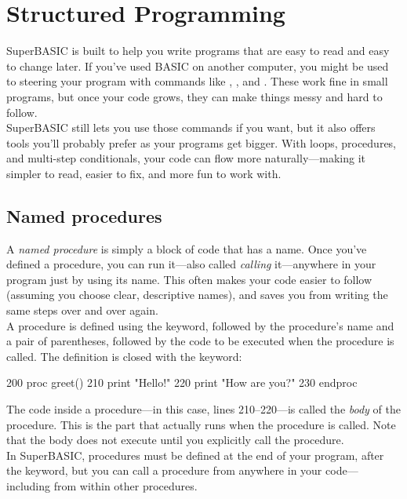\chapter{Structured Programming}
\label{chap:structured}

SuperBASIC is built to help you write programs that are easy to read and easy to change later. If you’ve used BASIC on another computer, you might be used to steering your program with commands like , , and . These work fine in small programs, but once your code grows, they can make things messy and hard to follow.\\

SuperBASIC still lets you use those commands if you want, but it also offers tools you’ll probably prefer as your programs get bigger. With loops, procedures, and multi-step conditionals, your code can flow more naturally—making it simpler to read, easier to fix, and more fun to work with.

\section{Named procedures}

A \emph{named procedure} is simply a block of code that has a name. Once you've defined a procedure, you can run it—also called \emph{calling} it—anywhere in your program just by using its name. This often makes your code easier to follow (assuming you choose clear, descriptive names), and saves you from writing the same steps over and over again.\\

A procedure is defined using the  keyword, followed by the procedure’s name and a pair of parentheses, followed by the code to be executed when the procedure is called. The definition is closed with the  keyword:

\begin{lst}
200 proc greet()
210   print "Hello!"
220   print "How are you?"
230 endproc
\end{lst}

The code inside a procedure—in this case, lines 210–220—is called the \emph{body} of the procedure. This is the part that actually runs when the procedure is called. Note that the body does not execute until you explicitly call the procedure.\\

In SuperBASIC, procedures must be defined at the end of your program, after the  keyword, but you can call a procedure from anywhere in your code—including from within other procedures.\\

